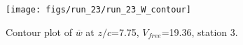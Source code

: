 \begin{figure}[H]
\centering
\texttt{[image: figs/run\_23/run\_23\_W\_contour]}
\caption{Contour plot of $\overline{w}$ at $z/c$=7.75, $V_{free}$=19.36, station 3.}
\label{fig:run_23_W_contour}
\end{figure}


